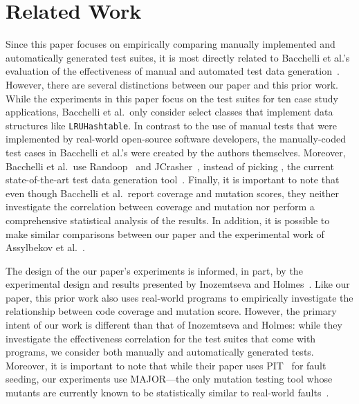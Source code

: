 
\section{Related Work} \label{sec:related_work}

Since this paper focuses on empirically comparing manually implemented and automatically generated test suites, it is most directly related to Bacchelli et al.'s evaluation of the effectiveness of manual and automated test data generation~\cite{bacchelli2008}. However, there are several distinctions between our paper and this prior work. While the experiments in this paper focus on the test suites for ten case study applications, Bacchelli et al.\ only consider select classes that implement data structures like {\tt LRUHashtable}. In contrast to the use of manual tests that were implemented by real-world open-source software developers, the manually-coded test cases in Bacchelli et al.'s were created by the authors themselves.  Moreover, Bacchelli et al.\ use Randoop~\cite{pacheco2007feedback} and JCrasher~\cite{csallner2004}, instead of picking \evo, the current state-of-the-art test data generation tool~\cite{fraser2013a}. Finally, it is important to note that even though Bacchelli et al.\ report coverage and mutation scores, they neither investigate the correlation between coverage and mutation nor perform a comprehensive statistical analysis of the results. In addition, it is possible to make similar comparisons between our paper and the experimental work of Assylbekov et al.~\cite{assylbekov2013}.

The design of the our paper's experiments is informed, in part, by the experimental design and results presented by Inozemtseva and Holmes~\cite{inozemtseva2014}. Like our paper, this prior work also uses real-world programs to empirically investigate the relationship between code coverage and mutation score. However, the primary intent of our work is different than that of Inozemtseva and Holmes: while they investigate the effectiveness correlation for the test suites that come with programs, we consider both manually and automatically generated tests. Moreover, it is important to note that while their paper uses PIT~\cite{pit2014} for fault seeding, our experiments use MAJOR---the only mutation testing tool whose mutants are currently known to be statistically similar to real-world faults~\cite{just2014}.

